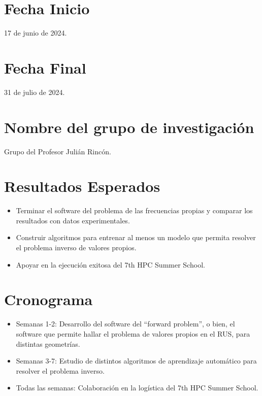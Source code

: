 \documentclass[12pt]{article}
\begin{document}
\section{Fecha Inicio}
17 de junio de 2024.
\section{Fecha Final}
31 de julio de 2024.

\section{Nombre del grupo de investigación}
Grupo del Profesor Julián Rincón.

\section{Resultados Esperados}
\begin{itemize}
    \item Terminar el software del problema de las frecuencias propias y comparar los resultados con datos experimentales. 
    \item Construir algoritmos para entrenar al menos un modelo que permita resolver el problema inverso de valores propios. 
    \item Apoyar en la ejecución exitosa del 7th HPC Summer School.
\end{itemize}


\section{Cronograma}
\begin{itemize}
    \item Semanas 1-2: Desarrollo del software del ``forward problem'', o bien, el software que permite hallar el problema de valores propios en el RUS, para distintas geometrías.
    \item Semanas 3-7: Estudio de distintos algoritmos de aprendizaje automático para resolver el problema inverso.
    \item Todas las semanas: Colaboración en la logística del 7th HPC Summer School.
\end{itemize}








\vspace{1.5cm}
\end{document}
